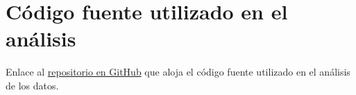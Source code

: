 \documentclass[a4paper]{report}
\begin{document}
\section{Código fuente utilizado en el análisis}
Enlace al \href{https://github.com/bettachini/tallerTesis/tree/main/sismosURL}{repositorio en GitHub} que aloja el código fuente utilizado en el análisis de los datos.



%
%
\end{document}

